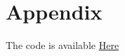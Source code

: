 \documentclass{article}
\begin{document}

    

    
\section{Appendix}
    The code is available
    \hyperlink{https://github.com/Elijawhan/CPE490PROJECT}{Here}
\end{document}
